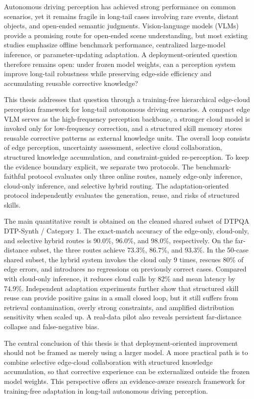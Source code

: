 \begin{abstract*}
Autonomous driving perception has achieved strong performance on common scenarios, yet it remains fragile in long-tail cases involving rare events, distant objects, and open-ended semantic judgments. Vision-language models (VLMs) provide a promising route for open-ended scene understanding, but most existing studies emphasize offline benchmark performance, centralized large-model inference, or parameter-updating adaptation. A deployment-oriented question therefore remains open: under frozen model weights, can a perception system improve long-tail robustness while preserving edge-side efficiency and accumulating reusable corrective knowledge?

This thesis addresses that question through a training-free hierarchical edge-cloud perception framework for long-tail autonomous driving scenarios. A compact edge VLM serves as the high-frequency perception backbone, a stronger cloud model is invoked only for low-frequency correction, and a structured skill memory stores reusable corrective patterns as external knowledge units. The overall loop consists of edge perception, uncertainty assessment, selective cloud collaboration, structured knowledge accumulation, and constraint-guided re-perception. To keep the evidence boundary explicit, we separate two protocols. The benchmark-faithful protocol evaluates only three online routes, namely edge-only inference, cloud-only inference, and selective hybrid routing. The adaptation-oriented protocol independently evaluates the generation, reuse, and risks of structured skills.

The main quantitative result is obtained on the cleaned shared subset of DTPQA DTP-Synth / Category 1. The exact-match accuracy of the edge-only, cloud-only, and selective hybrid routes is 90.0\%, 96.0\%, and 98.0\%, respectively. On the far-distance subset, the three routes achieve 73.3\%, 86.7\%, and 93.3\%. In the 50-case shared subset, the hybrid system invokes the cloud only 9 times, rescues 80\% of edge errors, and introduces no regressions on previously correct cases. Compared with cloud-only inference, it reduces cloud calls by 82\% and mean latency by 74.9\%. Independent adaptation experiments further show that structured skill reuse can provide positive gains in a small closed loop, but it still suffers from retrieval contamination, overly strong constraints, and amplified distribution sensitivity when scaled up. A real-data pilot also reveals persistent far-distance collapse and false-negative bias.

The central conclusion of this thesis is that deployment-oriented improvement should not be framed as merely using a larger model. A more practical path is to combine selective edge-cloud collaboration with structured knowledge accumulation, so that corrective experience can be externalized outside the frozen model weights. This perspective offers an evidence-aware research framework for training-free adaptation in long-tail autonomous driving perception.
\end{abstract*}
